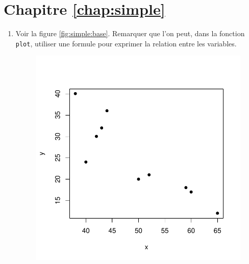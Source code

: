 \section*{Chapitre \ref{chap:simple}}

\begin{solution}{2.1}
    \begin{enumerate}
    \item Voir la figure \ref{fig:simple:base}. Remarquer que l'on
      peut, dans la fonction \texttt{plot}, utiliser une formule pour
      exprimer la relation entre les variables.
      \begin{figure}
\begin{knitrout}
\color{fgcolor}\begin{kframe}
\begin{alltt}
\hlkwb{<-}\hlstd{(}\hlstd{,} \hlstd{,} \hlstd{,} \hlstd{,} \hlstd{,} \hlstd{,} \hlstd{,} \hlstd{,} \hlstd{,} \hlstd{)}
\hlkwb{<-}\hlstd{(}\hlstd{,} \hlstd{,} \hlstd{,} \hlstd{,} \hlstd{,} \hlstd{,} \hlstd{,} \hlstd{,} \hlstd{,} \hlstd{)}
 \hlopt{~}   \hlstd{=} \hlstd{)}
\end{alltt}
\end{kframe}

{\centering \includegraphics[width=.45\linewidth]{figure/fig-simple-base-1}

}




\end{knitrout}
\end{figure}
\end{enumerate}
\end{solution}
